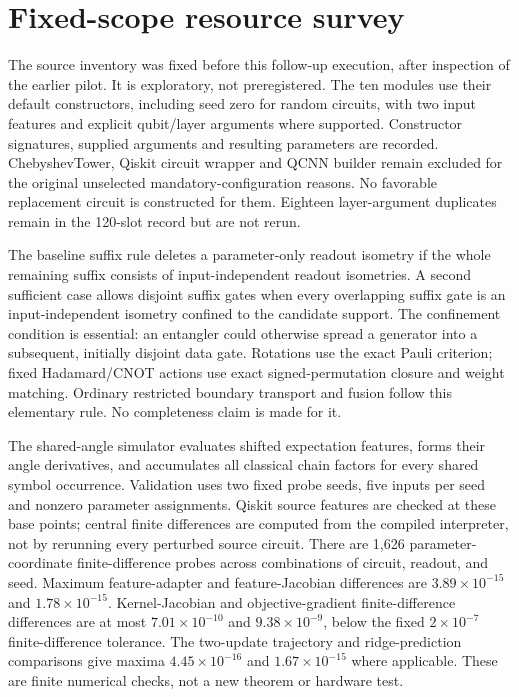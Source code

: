 \section{Fixed-scope resource survey}
\label{app:survey}
The source inventory was fixed before this follow-up execution, after
inspection of the earlier pilot. It is exploratory, not preregistered.
The ten modules use their default constructors, including seed zero
for random circuits, with two input features and explicit qubit/layer
arguments where supported. Constructor signatures, supplied arguments
and resulting parameters are recorded. ChebyshevTower, Qiskit circuit
wrapper and QCNN builder remain excluded for the original unselected
mandatory-configuration reasons. No favorable replacement circuit is
constructed for them. Eighteen layer-argument duplicates remain in
the 120-slot record but are not rerun.

The baseline suffix rule deletes a parameter-only readout isometry if
the whole remaining suffix consists of input-independent readout
isometries. A second sufficient case allows disjoint suffix gates when
every overlapping suffix gate is an input-independent isometry confined
to the candidate support. The confinement condition is essential:
an entangler could otherwise spread a generator into a subsequent,
initially disjoint data gate. Rotations use the exact Pauli criterion;
fixed Hadamard/CNOT actions use exact signed-permutation closure and
weight matching. Ordinary restricted boundary transport and fusion
follow this elementary rule. No completeness claim is made for it.

The shared-angle simulator evaluates shifted expectation features,
forms their angle derivatives, and accumulates all classical chain
factors for every shared symbol occurrence. Validation uses two fixed
probe seeds, five inputs per seed and nonzero parameter assignments.
Qiskit source features are checked at these base points; central finite
differences are computed from the compiled interpreter, not by rerunning
every perturbed source circuit. There are 1,626 parameter-coordinate
finite-difference probes across combinations of circuit, readout, and seed.
Maximum feature-adapter and feature-Jacobian differences are
$3.89\times10^{-15}$ and $1.78\times10^{-15}$.
Kernel-Jacobian and objective-gradient finite-difference differences
are at most $7.01\times10^{-10}$ and $9.38\times10^{-9}$,
below the fixed $2\times10^{-7}$ finite-difference tolerance.
The two-update trajectory and ridge-prediction comparisons give maxima
$4.45\times10^{-16}$ and $1.67\times10^{-15}$ where applicable.
These are finite numerical checks, not a new theorem or hardware test.

